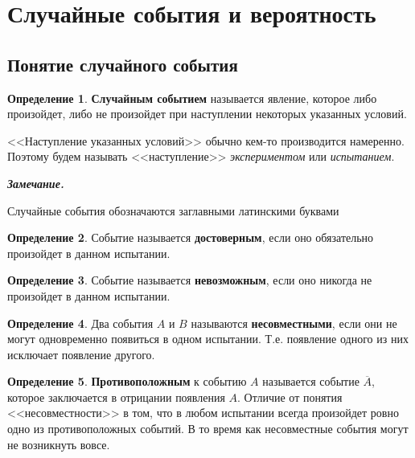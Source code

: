 \documentclass[12pt,a4paper]{article}
\theoremstyle{definition}
\newtheorem{definition}{Определение}[section]
\theoremstyle{definition}
\theoremstyle{remark}
\newenvironment{remark}{
  \par\noindent\textbf{\textit{Замечание.}}~
}{\par}
\theoremstyle{corollary}
\newcommand{\nextblock}{\vspace{1.5em}\noindent}
\theoremstyle{bolditalic}
\begin{document}
\newpage

\section{Случайные события и вероятность}

\subsection{Понятие случайного события}

\begin{definition}
    \textbf{Случайным событием} называется явление, которое либо произойдет, либо не произойдет при наступлении некоторых указанных условий.
\end{definition}

<<Наступление указанных условий>> обычно кем-то производится намеренно. Поэтому будем называть <<наступление>> \textit{экспериментом} или \textit{испытанием}. 

\nextblock

\begin{remark}
    Случайные события обозначаются заглавными латинскими буквами
\end{remark}

\begin{definition}
    Событие называется \textbf{достоверным}, если оно обязательно произойдет в данном испытании.
\end{definition}

\begin{definition}
    Событие называется \textbf{невозможным}, если оно никогда не произойдет в данном испытании.
\end{definition}

\begin{definition}
    Два события $A$ и $B$ называются \textbf{несовместными}, если они не могут одновременно появиться в одном испытании. Т.е. появление одного из них исключает появление другого.
\end{definition}

\begin{definition}
    \textbf{Противоположным} к событию $A$ называется событие $\overline{A}$, которое заключается в отрицании появления $A$. Отличие от понятия <<несовместности>> в том, что в любом испытании всегда произойдет ровно одно из противоположных событий. В то время как несовместные события могут не возникнуть вовсе.
\end{definition}
\end{document}
